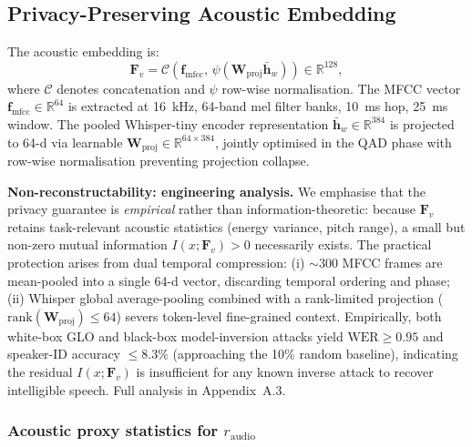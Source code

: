 \documentclass[lettersize,journal]{IEEEtran}
\begin{document}
\subsection{Privacy-Preserving Acoustic Embedding}
\label{sec:acoustic}

The acoustic embedding is:
\begin{equation}
  \bm{F}_v = \mathcal{C}\!\left(\bm{f}_{\mathrm{mfcc}},\,
    \psi(\bm{W}_{\mathrm{proj}}\bar{\bm{h}}_w)\right) \in \mathbb{R}^{128},
  \label{eq:fv}
\end{equation}
where $\mathcal{C}$ denotes concatenation and $\psi$ row-wise
normalisation.  The MFCC vector $\bm{f}_{\mathrm{mfcc}} \in
\mathbb{R}^{64}$ is extracted at 16~kHz, 64-band mel filter banks,
10~ms hop, 25~ms window.  The pooled Whisper-tiny encoder
representation $\bar{\bm{h}}_w \in \mathbb{R}^{384}$ is projected to
64-d via learnable $\bm{W}_{\mathrm{proj}} \in \mathbb{R}^{64\times384}$,
jointly optimised in the QAD phase with row-wise normalisation
preventing projection collapse.

\textbf{Non-reconstructability: engineering analysis.}  We emphasise
that the privacy guarantee is \emph{empirical} rather than
information-theoretic: because $\bm{F}_v$ retains task-relevant
acoustic statistics (energy variance, pitch range), a small but
non-zero mutual information $I(x;\bm{F}_v)>0$ necessarily exists.
The practical protection arises from dual temporal compression: (i)
$\sim$300 MFCC frames are mean-pooled into a single 64-d vector,
discarding temporal ordering and phase; (ii) Whisper global
average-pooling combined with a rank-limited projection
($\mathrm{rank}(\bm{W}_{\mathrm{proj}})\le 64$) severs token-level
fine-grained context.  Empirically, both white-box GLO and black-box
model-inversion attacks yield $\text{WER}\ge 0.95$ and speaker-ID
accuracy $\le 8.3\%$ (approaching the 10\% random baseline),
indicating the residual $I(x;\bm{F}_v)$ is insufficient for any known
inverse attack to recover intelligible speech.  Full analysis in
Appendix~A.3.

\subsubsection{Acoustic proxy statistics for $r_{\mathrm{audio}}$}
\end{document}
